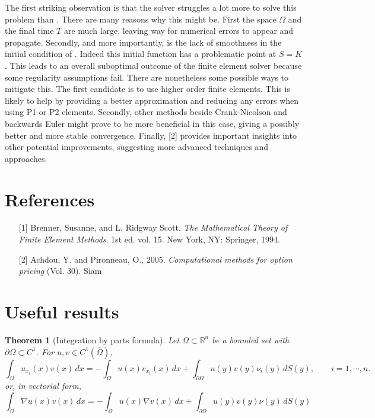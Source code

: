 \documentclass{article}
\newtheorem{thm}{Theorem}[section]
\begin{document}
The first striking observation is that the solver struggles a lot more to solve this problem than . There are many reasons why this might be. First the space $\Omega$ and the final time $T$ are much large, leaving way for numerical errors to appear and propagate. Secondly, and more importantly, is the lack of smoothness in the initial condition of . Indeed this initial function has a problematic point at $S=K$. This leads to an overall suboptimal outcome of the finite element solver because some regularity assumptions fail. 
There are nonetheless some possible ways to mitigate this. The first candidate is to use higher order finite elements. This is likely to help by providing a better approximation and reducing any errors when using P1 or P2 elements. Secondly, other methods beside Crank-Nicolson and backwards Euler might prove to be more beneficial in this case, giving a possibly better and more stable convergence. Finally, [2] provides important insights into other potential improvements, suggesting more advanced techniques and approaches.


\newpage
\section*{References}
\begin{itemize}
    \item[] [1] Brenner, Susanne, and L. Ridgway Scott. \textit{The Mathematical Theory of Finite Element Methods}. 1st ed. vol. 15. New York, NY: Springer, 1994.
    \item[] [2] Achdou, Y. and Pironneau, O., 2005. \textit{Computational methods for option pricing} (Vol. 30). Siam
\end{itemize}


\appendix
\section{Useful results}


\begin{thm}[Integration by parts formula] \label{thm:by_parts}
Let $\Omega \subset \mathbb{R}^n$ be a bounded set with $\partial\Omega \subset C^1$. For $u, v \in C^1(\bar{\Omega})$,
\[
\int_\Omega u_{x_i}(x)v(x)\,dx = -\int_\Omega u(x)v_{x_i}(x)\,dx + \int_{\partial\Omega} u(y)v(y)\nu_i(y)\,dS(y), \qquad i = 1, \cdots, n.
\]
or, in vectorial form,
\[
\int_\Omega \nabla u(x)v(x)\,dx = -\int_\Omega u(x)\nabla v(x)\,dx + \int_{\partial\Omega} u(y)v(y)\nu(y)\,dS(y)
\]
\end{thm}
\end{document}
